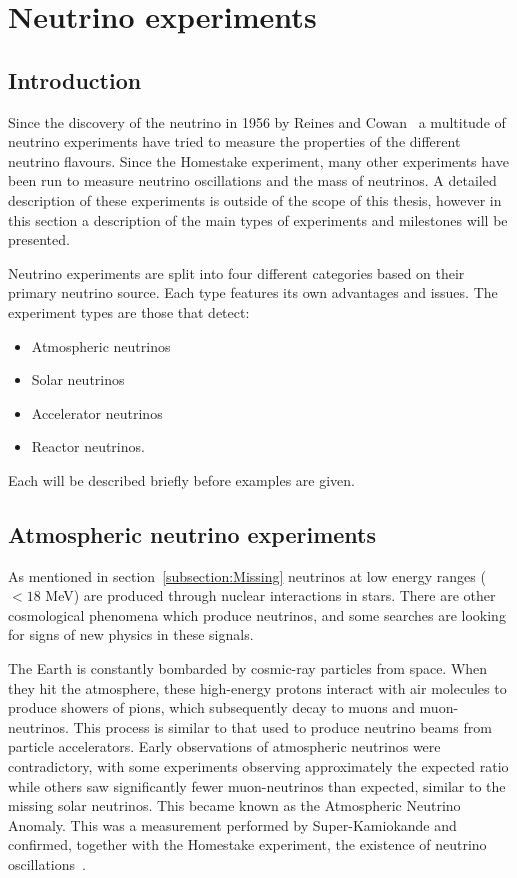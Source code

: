 \chapter{Neutrino experiments}
\label{c:expIntro}

\section{Introduction}
Since the discovery of the neutrino in 1956 by Reines and Cowan~\cite{6Reines} a multitude of neutrino experiments have tried to measure the properties of the different neutrino flavours. Since the Homestake experiment, many other experiments have been run to measure neutrino oscillations and the mass of neutrinos. A detailed description of these experiments is outside of the scope of this thesis, however in this section a description of the main types of experiments and milestones will be presented.

Neutrino experiments are split into four different categories based on their primary neutrino source. Each type features its own advantages and issues.
The experiment types are those that detect:
\begin{itemize}
\item Atmospheric neutrinos
\item Solar neutrinos
\item Accelerator neutrinos
\item Reactor neutrinos.
\end{itemize}
Each will be described briefly before examples are given.

\pagebreak
\newpage
\section{Atmospheric neutrino experiments}

As mentioned in section~\ref{subsection:Missing} neutrinos at low energy ranges ($<18$ MeV) are produced through nuclear interactions in stars. There are other cosmological phenomena which produce neutrinos, and some searches are looking for signs of new physics in these signals. 

The Earth is constantly bombarded by cosmic-ray particles from space. When they hit the atmosphere, these high-energy protons interact with air molecules to produce showers of pions, which subsequently decay to muons and muon-neutrinos. This process is similar to that used to produce neutrino beams from particle accelerators. Early observations of atmospheric neutrinos were contradictory, with some experiments observing approximately the expected ratio while others saw significantly fewer muon-neutrinos than expected, similar to the missing solar neutrinos. This became known as the Atmospheric Neutrino Anomaly. This was a measurement performed by Super-Kamiokande and confirmed, together with the Homestake experiment, the existence of neutrino oscillations~\cite{10Fukuda, 9Davis}.


